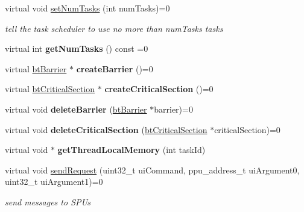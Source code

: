 \begin{DoxyCompactItemize}
virtual void \hyperlink{classbtThreadSupportInterface_a775436d1d71cc85639847d217aca78e6}{set\+Num\+Tasks} (int num\+Tasks)=0
\begin{DoxyCompactList}\small\item\em tell the task scheduler to use no more than num\+Tasks tasks \end{DoxyCompactList}\item 
\mbox{\label{classbtThreadSupportInterface_acff24c922ddfd3d8b3a4353a8c03755d}} 
virtual int {\bfseries get\+Num\+Tasks} () const =0
\item 
\mbox{\label{classbtThreadSupportInterface_a227d5e777627f37d99a4301dfc88c618}} 
virtual \hyperlink{classbtBarrier}{bt\+Barrier} $\ast$ {\bfseries create\+Barrier} ()=0
\item 
\mbox{\label{classbtThreadSupportInterface_a503dbd240c46fdf8a2c7bfe396f2e92d}} 
virtual \hyperlink{classbtCriticalSection}{bt\+Critical\+Section} $\ast$ {\bfseries create\+Critical\+Section} ()=0
\item 
\mbox{\label{classbtThreadSupportInterface_abea87baf684bbf17d55491712b49007a}} 
virtual void {\bfseries delete\+Barrier} (\hyperlink{classbtBarrier}{bt\+Barrier} $\ast$barrier)=0
\item 
\mbox{\label{classbtThreadSupportInterface_abfacf16e211a97d4f52a14330133e780}} 
virtual void {\bfseries delete\+Critical\+Section} (\hyperlink{classbtCriticalSection}{bt\+Critical\+Section} $\ast$critical\+Section)=0
\item 
\mbox{\label{classbtThreadSupportInterface_a9870ef95be61b71ddef44640b9bf4a15}} 
virtual void $\ast$ {\bfseries get\+Thread\+Local\+Memory} (int task\+Id)
\item 
\mbox{\label{classbtThreadSupportInterface_a2c20a0b41be978c429e0b1a2b2f03152}} 
virtual void \hyperlink{classbtThreadSupportInterface_a2c20a0b41be978c429e0b1a2b2f03152}{send\+Request} (uint32\+\_\+t ui\+Command, ppu\+\_\+address\+\_\+t ui\+Argument0, uint32\+\_\+t ui\+Argument1)=0
\begin{DoxyCompactList}\small\item\em send messages to S\+P\+Us \end{DoxyCompactList}\item 

\end{DoxyCompactItemize}
